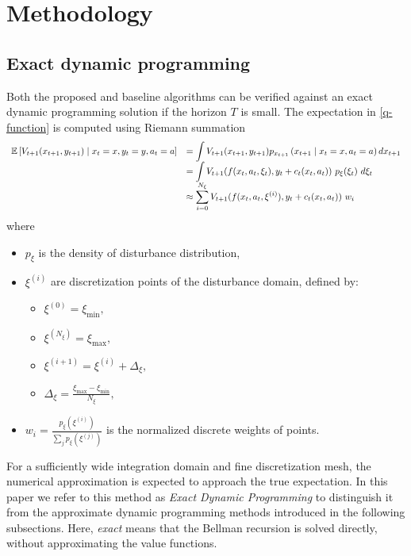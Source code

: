 \section{Methodology}
\label{sec:method}

\subsection{Exact dynamic programming}
\label{method:exact}
Both the proposed and baseline algorithms can be verified against an exact dynamic programming solution if the horizon $T$ is small. The expectation in \eqref{q-function} is computed using Riemann summation
\begin{equation}
	\begin{array}{rl}
		\mathbb{E} \left[ V_{t+1} (x_{t+1}, y_{t+1}) \mid x_t = x, y_t = y, a_t = a \right] & \displaystyle = \int V_{t+1} (x_{t+1}, y_{t+1}) p_{x_{t+1}} \left( x_{t+1} \mid x_t = x, a_t = a \right) d x_{t+1} \\
		& \displaystyle = \int V_{t+1} (f(x_t, a_t, \xi_t), y_t + c_t(x_t, a_t))\ p_{\xi}(\xi_t)\ d \xi_t \\
		& \displaystyle \approx \sum_{i=0}^{N_{\xi}} V_{t+1} (f(x_t, a_t, \xi^{(i)}), y_t + c_t(x_t, a_t))\ w_i
	\end{array}
	\label{riemann-expectation}
\end{equation}
where
\begin{itemize}
	\item $p_{\xi}$ is the density of disturbance distribution,
	\item $\xi^{(i)}$ are discretization points of the disturbance domain, defined by:
	\begin{itemize}
		\item $\xi^{(0)} = \xi_{\text{min}},$
		\item $\xi^{(N_{\xi})} = \xi_{\text{max}},$
		\item $\xi^{(i+1)} = \xi^{(i)} + \Delta_{\xi},$ 
		\item $\Delta_{\xi} = \frac{\xi_{\text{max}} - \xi_{\text{min}}}{N_{\xi}},$
	\end{itemize}
	\item $w_i = \frac{p_{\xi}(\xi^{(i)})}{\sum_j p_{\xi}(\xi^{(j)})}$ is the normalized discrete weights of points.
\end{itemize}

For a sufficiently wide integration domain and fine discretization mesh, the numerical approximation is expected to approach the true expectation. In this paper we refer to this method as \textit{Exact Dynamic Programming} to distinguish it from the approximate dynamic programming methods introduced in the following subsections. Here, \textit{exact} means that the Bellman recursion is solved directly, without approximating the value functions.

